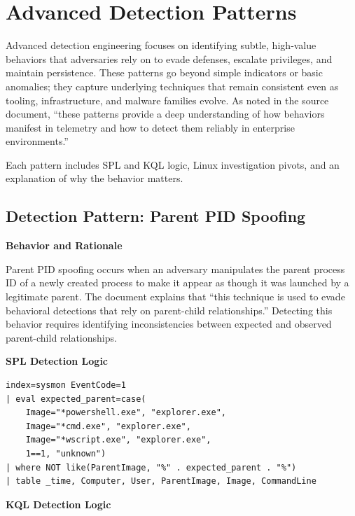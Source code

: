 \section{Advanced Detection Patterns}

Advanced detection engineering focuses on identifying subtle, high‑value behaviors that adversaries rely on to evade 
defenses, escalate privileges, and maintain persistence. These patterns go beyond simple indicators or basic anomalies; 
they capture underlying techniques that remain consistent even as tooling, infrastructure, and malware families evolve. 
As noted in the source document, “these patterns provide a deep understanding of how behaviors manifest in telemetry and 
how to detect them reliably in enterprise environments.” 

Each pattern includes SPL and KQL logic, Linux investigation pivots, and an explanation of why the behavior matters.


\subsection*{Detection Pattern: Parent PID Spoofing}

\textbf{Behavior and Rationale}

Parent PID spoofing occurs when an adversary manipulates the parent process ID of a newly created process to make it appear 
as though it was launched by a legitimate parent. The document explains that “this technique is used to evade behavioral 
detections that rely on parent-child relationships.” Detecting this behavior requires identifying inconsistencies between 
expected and observed parent-child relationships.

\textbf{SPL Detection Logic}

\begin{lstlisting}
index=sysmon EventCode=1
| eval expected_parent=case(
    Image="*powershell.exe", "explorer.exe",
    Image="*cmd.exe", "explorer.exe",
    Image="*wscript.exe", "explorer.exe",
    1==1, "unknown")
| where NOT like(ParentImage, "%" . expected_parent . "%")
| table _time, Computer, User, ParentImage, Image, CommandLine
\end{lstlisting}

\textbf{KQL Detection Logic}

